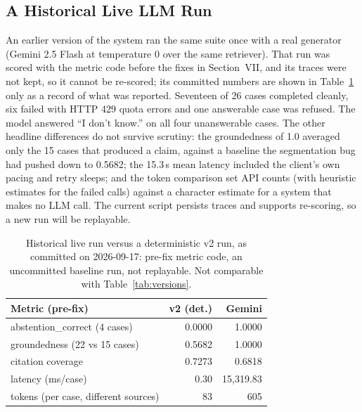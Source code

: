 \documentclass[conference]{IEEEtran}
\begin{document}
\subsection{A Historical Live LLM Run}
An earlier version of the system ran the same suite once with a real
generator (Gemini 2.5 Flash at temperature 0 over the same retriever).
That run was scored with the metric code before the fixes in
Section~VII, and its traces were not kept, so it cannot be re-scored; its
committed numbers are shown in Table~\ref{tab:live} only as a record of
what was reported. Seventeen of 26 cases completed cleanly, six failed with
HTTP 429 quota errors and one answerable case was refused. The model
answered ``I don't know.'' on all four unanswerable cases. The other
headline differences do not survive scrutiny: the groundedness of 1.0
averaged only the 15 cases that produced a claim, against a baseline the
segmentation bug had pushed down to 0.5682; the 15.3\,s mean latency
included the client's own pacing and retry sleeps; and the token comparison
set API counts (with heuristic estimates for the failed calls) against a
character estimate for a system that makes no LLM call. The current script
persists traces and supports re-scoring, so a new run will be replayable.

\begin{table}[t]
\centering
\caption{Historical live run versus a deterministic v2 run, as committed
on 2026-09-17: pre-fix metric code, an uncommitted baseline run, not
replayable. Not comparable with Table~\ref{tab:versions}.}
\label{tab:live}
\small
\begin{tabular}{@{}lrr@{}}
\toprule
Metric (pre-fix) & v2 (det.) & Gemini \\
\midrule
abstention\_correct (4 cases) & 0.0000 & 1.0000 \\
groundedness (22 vs 15 cases) & 0.5682 & 1.0000 \\
citation coverage & 0.7273 & 0.6818 \\
latency (ms/case) & 0.30 & 15{,}319.83 \\
tokens (per case, different sources) & 83 & 605 \\
\bottomrule
\end{tabular}
\end{table}
\end{document}
